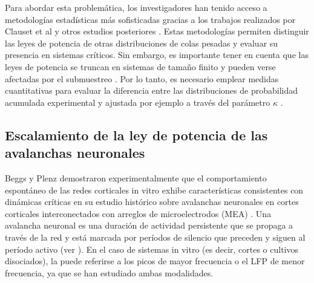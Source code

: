 Para abordar esta problemática, los investigadores han tenido acceso a metodologías estadísticas más sofisticadas gracias a los trabajos realizados por Clauset et al  \cite{clauset_power-law_2009} y otros estudios posteriores \cite{klaus_statistical_2011,markovic_power_2014}. Estas metodologías permiten distinguir las leyes de potencia de otras distribuciones de colas pesadas y evaluar su presencia en sistemas críticos. Sin embargo, es importante tener en cuenta que las leyes de potencia se truncan en sistemas de tamaño finito \cite{bonachela_self-organization_2010} y pueden verse afectadas por el submuestreo \cite{ribeiro_undersampled_2014}. Por lo tanto, es necesario emplear medidas cuantitativas para evaluar la diferencia entre las distribuciones de probabilidad acumulada experimental y ajustada por ejemplo  a través del parámetro $\kappa$ \cite{shew_neuronal_2009}.



\subsection{Escalamiento de  la ley de potencia de las avalanchas neuronales }

Beggs y Plenz demostraron experimentalmente que el comportamiento espontáneo de las redes corticales in vitro exhibe características consistentes con dinámicas críticas en su estudio histórico sobre avalanchas neuronales en cortes corticales interconectados con arreglos de microelectrodos (\gls{MEA}) \cite{beggs_neuronal_2003} . Una avalancha neuronal es una duración de actividad persistente que se propaga a través de la red y está marcada por períodos de silencio que preceden y siguen al período activo (ver ). En el caso de sistemas in vitro (es decir, cortes o cultivos disociados), la  puede referirse a los picos de mayor frecuencia o el \gls{LFP} de menor frecuencia, ya que se han estudiado ambas modalidades.\\

